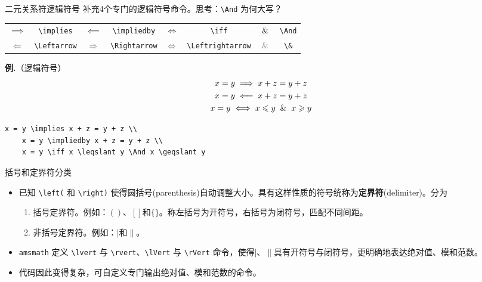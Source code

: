 \documentclass[mathserif]{beamer}
\providecommand{\gray}[2][0.5]{\textcolor[gray]{#1}{#2}}
\newcommand{\codegreen}[1]{\textcolor{codegreen}{#1}}
\newenvironment{instance}{\zihao{-5}\textbf{\songti \codegreen{例.}}}{\hfill\par}
\begin{document}
\begin{frame}[fragile]{二元关系符}{逻辑符号}
补充4个专门的逻辑符号命令。思考：\lstinline'\And' 为何大写？
\begin{table}[H]
\centering
\begin{tabular}{cc|cc|cc|cc}
	\toprule
	$\implies$ & \lstinline'\implies' & $\impliedby$ & \lstinline'\impliedby' & $\iff$ & \lstinline'\iff'& $\And$  & \lstinline'\And' \\
	$\gray{\Leftarrow}$ & \lstinline'\Leftarrow' & $\gray{\Rightarrow}$ & \lstinline'\Rightarrow' & $\gray{\Leftrightarrow}$ & \lstinline'\Leftrightarrow' & $\gray{\&}$  & \lstinline'\&' \\
	\bottomrule
\end{tabular}
\end{table}
\begin{instance}（逻辑符号）
\begin{equation*}
	\begin{gathered}
		x = y \implies x + z = y + z \\
		x = y \impliedby x + z = y + z \\
		x = y \iff x \leqslant y \And x \geqslant y
	\end{gathered}
\end{equation*}
\begin{lstlisting}[numbers=none]
	x = y \implies x + z = y + z \\
	x = y \impliedby x + z = y + z \\
	x = y \iff x \leqslant y \And x \geqslant y
\end{lstlisting}
\end{instance}
\end{frame}

\begin{frame}[fragile]{括号和定界符}{分类}
\begin{itemize}

\item 已知 \lstinline'\left(' 和 \lstinline'\right)' 使得圆括号(parenthesis)自动调整大小。具有这样性质的符号统称为\textbf{\songti 定界符}(delimiter)。分为
	\begin{enumerate}[(1)]

	\item 括号定界符。例如：$()$、$[]$和$\{\}$。称左括号为开符号，右括号为闭符号\cite{LaTeX入门}，匹配不同间距。

	\item 非括号定界符。例如：$|$和$\|$。

\end{enumerate}

\item \verb'amsmath' 定义 \lstinline'\lvert' 与 \lstinline'\rvert'、\lstinline'\lVert' 与 \lstinline'\rVert' 命令，使得$|$、$\|$具有开符号与闭符号，更明确地表达绝对值、模和范数。

\item 代码因此变得复杂，可自定义专门输出绝对值、模和范数的命令。

\end{itemize}
\end{frame}
\end{document}
